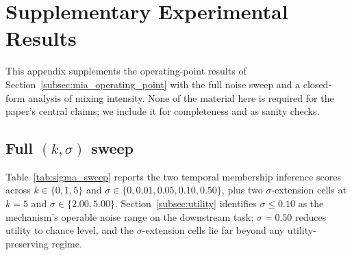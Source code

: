 \documentclass[letterpaper]{article} %
\begin{document}
\appendix

\section{Supplementary Experimental Results}
\label{app:supplementary}

This appendix supplements the operating-point results of Section~\ref{subsec:mia_operating_point} with the full noise sweep and a closed-form analysis of mixing intensity. None of the material here is required for the paper's central claims; we include it for completeness and as sanity checks.

\subsection{Full $(k, \sigma)$ sweep}
\label{app:sigma_sweep}

Table~\ref{tab:sigma_sweep} reports the two temporal membership inference scores across $k \in \{0, 1, 5\}$ and $\sigma \in \{0, 0.01, 0.05, 0.10, 0.50\}$, plus two $\sigma$-extension cells at $k = 5$ and $\sigma \in \{2.00, 5.00\}$. Section~\ref{subsec:utility} identifies $\sigma \le 0.10$ as the mechanism's operable noise range on the downstream task; $\sigma = 0.50$ reduces utility to chance level, and the $\sigma$-extension cells lie far beyond any utility-preserving regime.
\end{document}
